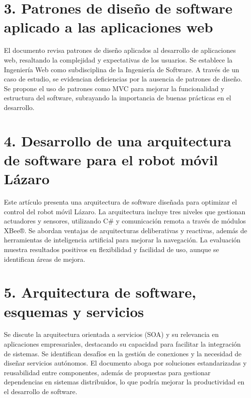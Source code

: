 \documentclass[twocolumn]{article}
\begin{document}
\printbibliography[heading=subbibliography]

\section*{3. Patrones de diseño de software aplicado a las aplicaciones web}
El documento revisa patrones de diseño aplicados al desarrollo de aplicaciones web, resaltando la complejidad y expectativas de los usuarios. Se establece la Ingeniería Web como subdisciplina de la Ingeniería de Software. A través de un caso de estudio, se evidencian deficiencias por la ausencia de patrones de diseño. Se propone el uso de patrones como MVC para mejorar la funcionalidad y estructura del software, subrayando la importancia de buenas prácticas en el desarrollo.


\printbibliography[heading=subbibliography]

\section*{4. Desarrollo de una arquitectura de software para el robot móvil Lázaro}
Este artículo presenta una arquitectura de software diseñada para optimizar el control del robot móvil Lázaro. La arquitectura incluye tres niveles que gestionan actuadores y sensores, utilizando C# y comunicación remota a través de módulos XBee®. Se abordan ventajas de arquitecturas deliberativas y reactivas, además de herramientas de inteligencia artificial para mejorar la navegación. La evaluación muestra resultados positivos en flexibilidad y facilidad de uso, aunque se identifican áreas de mejora.


\printbibliography[heading=subbibliography]

\section*{5. Arquitectura de software, esquemas y servicios}
Se discute la arquitectura orientada a servicios (SOA) y su relevancia en aplicaciones empresariales, destacando su capacidad para facilitar la integración de sistemas. Se identifican desafíos en la gestión de conexiones y la necesidad de diseñar servicios autónomos. El documento aboga por soluciones estandarizadas y reusabilidad entre componentes, además de propuestas para gestionar dependencias en sistemas distribuidos, lo que podría mejorar la productividad en el desarrollo de software.


\printbibliography[heading=subbibliography]
\end{document}
